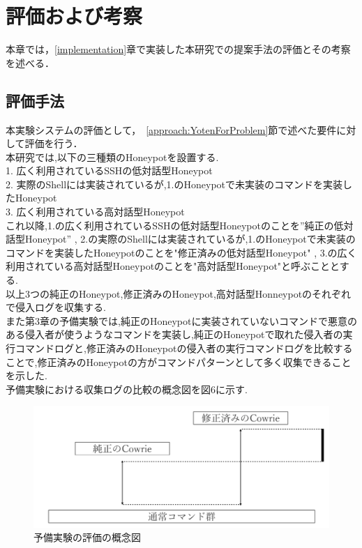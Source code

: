 \chapter{評価および考察}
\label{evaluation}

本章では，\ref{implementation}章で実装した本研究での提案手法の評価とその考察を述べる．

\section{評価手法}
\label{evaluation:method}

本実験システムの評価として，~\ref{approach:YotenForProblem}節で述べた要件に対して評価を行う．\\

本研究では,以下の三種類のHoneypotを設置する.\\
1. 広く利用されているSSHの低対話型Honeypot\\
2. 実際のShellには実装されているが,1.のHoneypotで未実装のコマンドを実装したHoneypot\\
3. 広く利用されている高対話型Honeypot\\

これ以降,1.の広く利用されているSSHの低対話型Honeypotのことを”純正の低対話型Honeypot” , 2.の実際のShellには実装されているが,1.のHoneypotで未実装のコマンドを実装したHoneypotのことを"修正済みの低対話型Honeypot" , 3.の広く利用されている高対話型Honeypotのことを"高対話型Honeypot"と呼ぶこととする.\\

以上3つの純正のHoneypot,修正済みのHoneypot,高対話型Honneypotのそれぞれで侵入ログを収集する.\\

また第3章の予備実験では,純正のHoneypotに実装されていないコマンドで悪意のある侵入者が使うようなコマンドを実装し,純正のHoneypotで取れた侵入者の実行コマンドログと,修正済みのHoneypotの侵入者の実行コマンドログを比較することで,修正済みのHoneypotの方がコマンドパターンとして多く収集できることを示した.\\
予備実験における収集ログの比較の概念図を図6に示す.

\begin{figure}[H]
    \centering
    \includegraphics[width=1.0\textwidth]{figures/termhyoka.png}
    \caption{予備実験の評価の概念図}
    \label{fig:evo}
\end{figure}

